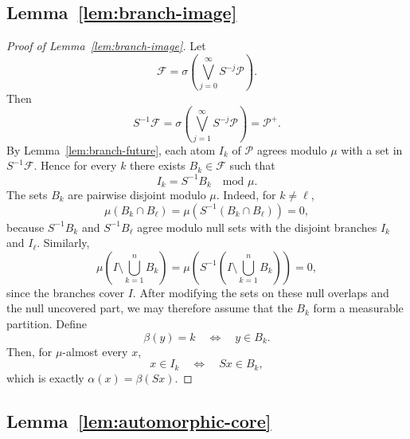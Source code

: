 \documentclass[11pt]{amsart}
\theoremstyle{plain}
\theoremstyle{definition}
\theoremstyle{remark}
\newcommand{\cP}{\mathcal P}
\begin{document}
\subsection{Lemma~\ref{lem:branch-image}}\label{app:lem-branch-image}

\begin{proof}[Proof of Lemma~\ref{lem:branch-image}]
Let
\[
        \mathcal F=\sigma\left(\bigvee_{j=0}^{\infty}S^{-j}\cP\right).
\]
Then
\[
        S^{-1}\mathcal F=\sigma\left(\bigvee_{j=1}^{\infty}S^{-j}\cP\right)=\cP^+.
\]
By Lemma~\ref{lem:branch-future}, each atom $I_k$ of $\cP$ agrees modulo $\mu$ with a set in $S^{-1}\mathcal F$. Hence for every $k$ there exists $B_k\in\mathcal F$ such that
\[
        I_k=S^{-1}B_k \quad \text{mod }\mu.
\]
The sets $B_k$ are pairwise disjoint modulo $\mu$. Indeed, for $k\neq\ell$,
\[
        \mu(B_k\cap B_\ell)
        =\mu(S^{-1}(B_k\cap B_\ell))=0,
\]
because $S^{-1}B_k$ and $S^{-1}B_\ell$ agree modulo null sets with the disjoint
branches $I_k$ and $I_\ell$. Similarly,
\[
        \mu\left(I\setminus\bigcup_{k=1}^nB_k\right)
        =\mu\left(S^{-1}\left(I\setminus\bigcup_{k=1}^nB_k\right)\right)=0,
\]
since the branches cover $I$. After modifying the sets on these null overlaps and the
null uncovered part, we may therefore assume that the $B_k$ form a measurable partition.
Define
\[
        \beta(y)=k\quad\Longleftrightarrow\quad y\in B_k.
\]
Then, for $\mu$-almost every $x$,
\[
        x\in I_k\quad\Longleftrightarrow\quad Sx\in B_k,
\]
which is exactly $\alpha(x)=\beta(Sx)$.
\end{proof}

\subsection{Lemma~\ref{lem:automorphic-core}}\label{app:lem-automorphic-core}
\end{document}
